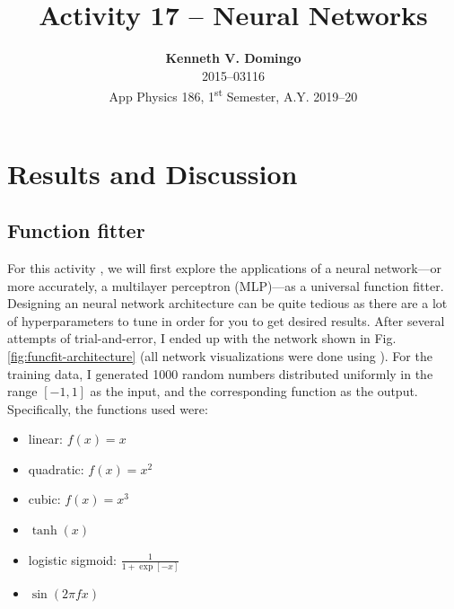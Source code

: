 \documentclass[12pt,a4paper]{article}
\newcommand{\activity}{Activity 17 -- Neural Networks}
\begin{document}
\title{\TitleFont \activity}
\author[ ]{\textbf{Kenneth V. Domingo} \\
2015--03116 \\
App Physics 186, 1\textsuperscript{st} Semester, A.Y. 2019--20}

\maketitle
\thispagestyle{titlestyle}

\section*{Results and Discussion}
\setcounter{section}{1}
\subsection{Function fitter}
For this activity \cite{soriano}, we will first explore the applications of a neural network---or more accurately, a multilayer perceptron (MLP)---as a universal function fitter. Designing an neural network architecture can be quite tedious as there are a lot of hyperparameters to tune in order for you to get desired results. After several attempts of trial-and-error, I ended up with the network shown in Fig. \ref{fig:funcfit-architecture} (all network visualizations were done using \cite{nn-svg}). For the training data, I generated 1000 random numbers distributed uniformly in the range $[-1, 1]$ as the input, and the corresponding function as the output. Specifically, the functions used were:

\begin{itemize}
	\item linear: $f(x) = x$
	\item quadratic: $f(x) = x^2$
	\item cubic: $f(x) = x^3$
	\item $\tanh(x)$
	\item logistic sigmoid: $\frac{1}{1 + \exp[-x]}$
	\item $\sin(2\pi fx)$
\end{itemize}
\end{document}
